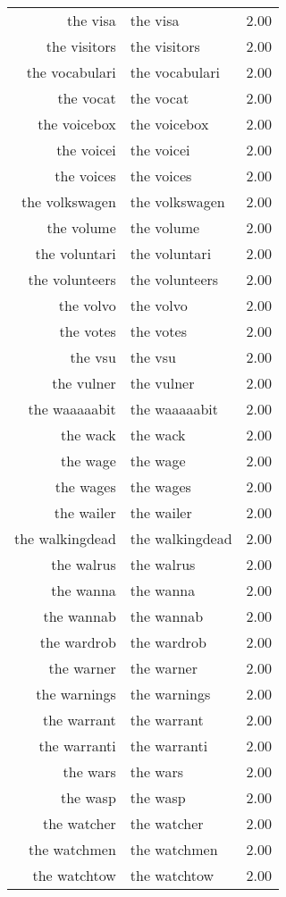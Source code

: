 \begin{table}[ht]
\begin{tabular}{rlr}
  the visa & the visa & 2.00 \\ 
  the visitors & the visitors & 2.00 \\ 
  the vocabulari & the vocabulari & 2.00 \\ 
  the vocat & the vocat & 2.00 \\ 
  the voicebox & the voicebox & 2.00 \\ 
  the voicei & the voicei & 2.00 \\ 
  the voices & the voices & 2.00 \\ 
  the volkswagen & the volkswagen & 2.00 \\ 
  the volume & the volume & 2.00 \\ 
  the voluntari & the voluntari & 2.00 \\ 
  the volunteers & the volunteers & 2.00 \\ 
  the volvo & the volvo & 2.00 \\ 
  the votes & the votes & 2.00 \\ 
  the vsu & the vsu & 2.00 \\ 
  the vulner & the vulner & 2.00 \\ 
  the waaaaabit & the waaaaabit & 2.00 \\ 
  the wack & the wack & 2.00 \\ 
  the wage & the wage & 2.00 \\ 
  the wages & the wages & 2.00 \\ 
  the wailer & the wailer & 2.00 \\ 
  the walkingdead & the walkingdead & 2.00 \\ 
  the walrus & the walrus & 2.00 \\ 
  the wanna & the wanna & 2.00 \\ 
  the wannab & the wannab & 2.00 \\ 
  the wardrob & the wardrob & 2.00 \\ 
  the warner & the warner & 2.00 \\ 
  the warnings & the warnings & 2.00 \\ 
  the warrant & the warrant & 2.00 \\ 
  the warranti & the warranti & 2.00 \\ 
  the wars & the wars & 2.00 \\ 
  the wasp & the wasp & 2.00 \\ 
  the watcher & the watcher & 2.00 \\ 
  the watchmen & the watchmen & 2.00 \\ 
  the watchtow & the watchtow & 2.00 \\ 

\end{tabular}
\end{table}
